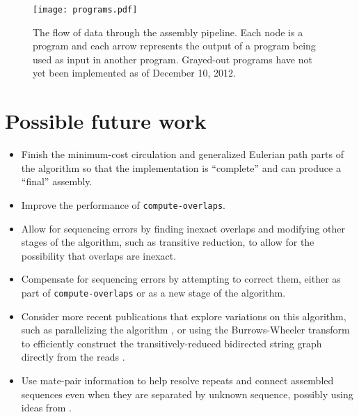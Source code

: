 \documentclass[10pt]{article}
\newcommand{\ProgramName}[1]{{\tt #1}}
\begin{document}
\begin{figure}
	\begin{center}
		\texttt{[image: programs.pdf]}
	\end{center}
	\caption{The flow of data through the assembly pipeline.  Each node is a
	program and each arrow represents the output of a program being used as
	input in another program.  Grayed-out programs have not yet been implemented
	as of December 10, 2012.}
	\label{fig:impl_graph}
\end{figure}

\section{Possible future work}

\begin{itemize}
\item Finish the minimum-cost circulation and generalized Eulerian path parts of
the algorithm so that the implementation is ``complete'' and can produce a
``final'' assembly.
\item Improve the performance of \ProgramName{compute-overlaps}.
\item Allow for sequencing errors by finding inexact overlaps and modifying other
stages of the algorithm, such as transitive reduction, to allow for the
possibility that overlaps are inexact.
\item Compensate for sequencing errors by attempting to correct them, either as
part of \ProgramName{compute-overlaps} or as a new stage of the algorithm.
\item Consider more recent publications that explore variations on this
algorithm, such as parallelizing the algorithm \cite{Jackson2008}, or using the
Burrows-Wheeler transform to efficiently construct the transitively-reduced
bidirected string graph directly from the reads \cite{Simpson2010}.
\item Use mate-pair information to help resolve repeats and connect assembled
sequences even when they are separated by unknown sequence, possibly using ideas
from \cite{Medvedev2009}.
\end{itemize}



\end{document}
